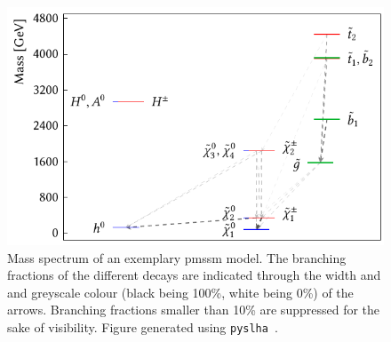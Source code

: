 \begin{figure}
	\centering\includegraphics[width=.6\textwidth]{thesis_plot_9127}
	\caption{
Mass spectrum of an exemplary \gls{pmssm} model. The branching fractions of the different decays are indicated through the width and and greyscale colour (black being 100\%, white being 0\%) of the arrows. Branching fractions smaller than 10\% are suppressed for the sake of visibility. Figure generated using \texttt{pyslha}~\cite{pyslha:2013jua}.}
\label{fig:slha_example}
\end{figure}




